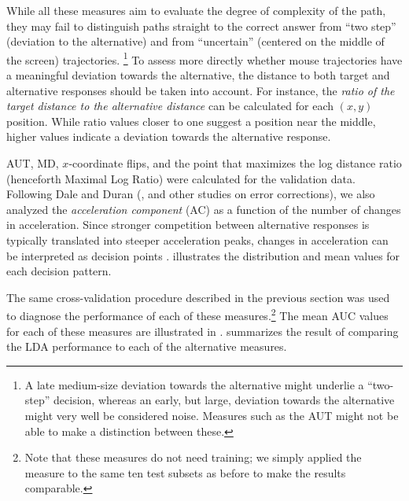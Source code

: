 \documentclass[11pt]{article}
\newcommand{\addMM}[1]{{\leavevmode\color{green}#1}}
\begin{document}
While all these measures aim to evaluate the degree of complexity of the path, they may fail to distinguish paths straight to the correct answer from ``two step'' (deviation to the alternative) and from ``uncertain'' (centered on the middle of the screen) trajectories.%
%
\footnote{A late medium-size deviation towards the alternative might underlie a ``two-step'' decision, whereas an early, but large, deviation towards the alternative might very well be considered noise. Measures such as the AUT might not be able to make a distinction between these.} 
To assess more directly whether mouse trajectories have a meaningful deviation towards the alternative, the distance to both target and alternative responses should be taken into account. 
For instance, the \textit{ratio of the target distance to the alternative distance} can be calculated for each $(x,y)$ position. While ratio values closer to one suggest a position near the middle, higher values indicate a deviation towards the alternative response. 

AUT, MD, $x$-coordinate flips, and the point that maximizes the log distance ratio (henceforth Maximal Log Ratio)  %
were calculated for the validation data. 
Following Dale and Duran (\citeyear{Dale2011}, and other studies on error corrections), we also analyzed the \emph{acceleration component} (AC) as a function of the number of changes in acceleration.
Since stronger competition between alternative responses is typically translated into steeper acceleration peaks, changes in acceleration can be interpreted as decision points \citep{Hehman2014}.   
 illustrates the distribution and mean values for each decision pattern.

The same cross-validation procedure described in the previous section was used to diagnose the performance of each of these measures.\footnote{Note that these measures do not need training; we simply applied the measure to the same ten test subsets as before to make the results comparable.} The mean AUC values for each of these measures are illustrated in .  summarizes the result of comparing the LDA performance to each of the alternative measures. 
\end{document}
